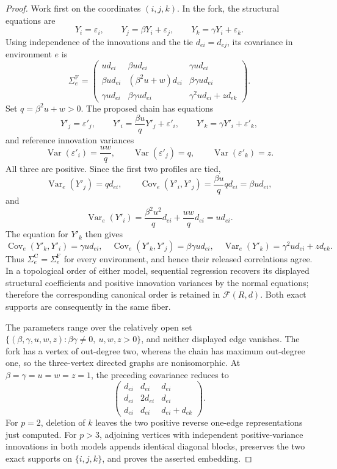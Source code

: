 \documentclass{article}
\begin{document}
\begin{proof}
Work first on the coordinates \((i,j,k)\).  In the fork, the structural equations are
\[
 Y_i=\varepsilon_i,\qquad Y_j=\beta Y_i+\varepsilon_j,
 \qquad Y_k=\gamma Y_i+\varepsilon_k.
\]
Using independence of the innovations and the tie \(d_{ei}=d_{ej}\), its covariance in environment \(e\) is
\[
 \Sigma_e^{\mathrm F}=
 \begin{pmatrix}
 ud_{ei}&\beta ud_{ei}&\gamma ud_{ei}\\
 \beta ud_{ei}&(\beta^2u+w)d_{ei}&\beta\gamma ud_{ei}\\
 \gamma ud_{ei}&\beta\gamma ud_{ei}&\gamma^2ud_{ei}+zd_{ek}
 \end{pmatrix}.
\]
Set \(q=\beta^2u+w>0\).  The proposed chain has equations
\[
 Y'_j=\varepsilon'_j,\qquad
 Y'_i=\frac{\beta u}{q}Y'_j+\varepsilon'_i,
 \qquad Y'_k=\gamma Y'_i+\varepsilon'_k,
\]
and reference innovation variances
\[
 \operatorname{Var}(\varepsilon'_i)=\frac{uw}{q},\qquad
 \operatorname{Var}(\varepsilon'_j)=q,\qquad
 \operatorname{Var}(\varepsilon'_k)=z.
\]
All three are positive.  Since the first two profiles are tied,
\[
 \operatorname{Var}_e(Y'_j)=qd_{ei},
 \qquad
 \operatorname{Cov}_e(Y'_i,Y'_j)=\frac{\beta u}{q}qd_{ei}=\beta ud_{ei},
\]
and
\[
 \operatorname{Var}_e(Y'_i)
 =\frac{\beta^2u^2}{q}d_{ei}+\frac{uw}{q}d_{ei}
 =ud_{ei}.
\]
The equation for \(Y'_k\) then gives
\[
 \operatorname{Cov}_e(Y'_k,Y'_i)=\gamma ud_{ei},\quad
 \operatorname{Cov}_e(Y'_k,Y'_j)=\beta\gamma ud_{ei},\quad
 \operatorname{Var}_e(Y'_k)=\gamma^2ud_{ei}+zd_{ek}.
\]
Thus \(\Sigma_e^{\mathrm C}=\Sigma_e^{\mathrm F}\) for every environment, and hence their released correlations agree.  In a topological order of either model, sequential regression recovers its displayed structural coefficients and positive innovation variances by the normal equations; therefore the corresponding canonical order is retained in \(\mathcal F(R,d)\).  Both exact supports are consequently in the same fiber.

The parameters range over the relatively open set
\(\{(\beta,\gamma,u,w,z):\beta\gamma\ne0,\ u,w,z>0\}\), and neither displayed edge vanishes.  The fork has a vertex of out-degree two, whereas the chain has maximum out-degree one, so the three-vertex directed graphs are nonisomorphic.  At \(\beta=\gamma=u=w=z=1\), the preceding covariance reduces to
\[
 \begin{pmatrix}
 d_{ei}&d_{ei}&d_{ei}\\
 d_{ei}&2d_{ei}&d_{ei}\\
 d_{ei}&d_{ei}&d_{ei}+d_{ek}
 \end{pmatrix}.
\]
For \(p=2\), deletion of \(k\) leaves the two positive reverse one-edge representations just computed.  For \(p>3\), adjoining vertices with independent positive-variance innovations in both models appends identical diagonal blocks, preserves the two exact supports on \(\{i,j,k\}\), and proves the asserted embedding.
\end{proof}
\end{document}
